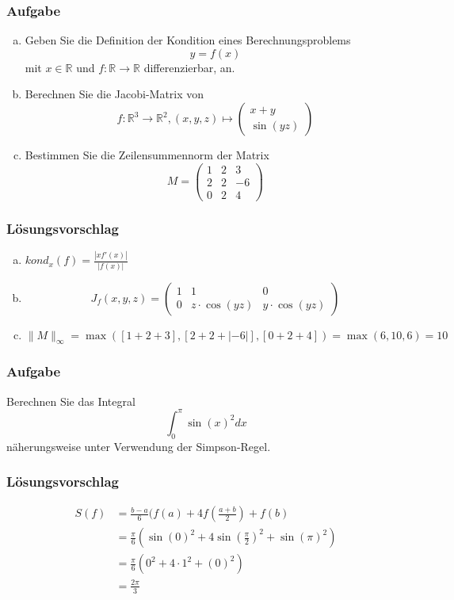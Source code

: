 \documentclass[a4paper,11pt]{scrartcl}
\newcounter{auf}
\newcommand{\Aufgabe}%
        {\addtocounter{auf}{1} \subsubsection*{\rmfamily  Aufgabe \theauf \hspace{1em}} }
\newcommand{\RR}{\mathbb{R}}
\begin{document}
\Aufgabe

\begin{enumerate}[a)]

\item Geben Sie die Definition der Kondition eines Berechnungsproblems 
$$
	y=f(x)
$$
mit $x \in \RR$ und $f:\RR \to \RR$ differenzierbar, an.
\item  Berechnen Sie die Jacobi-Matrix von
$$
f: \RR^3 \to \RR^2, (x,y,z) \mapsto \begin{pmatrix} x+y \\ \sin(yz) \end{pmatrix}
$$
\item Bestimmen Sie die Zeilensummennorm der Matrix
$$
M=\begin{pmatrix} 1&2&3 \\ 2&2&-6\\ 0 & 2&4 \end{pmatrix}
$$
\end{enumerate}
%

\subsubsection*{Lösungsvorschlag}
\begin{enumerate}[a)]
\item $kond_x(f)=\frac{|xf'(x)|}{|f(x)|}$
\item 
$$
J_f(x,y,z)=\begin{pmatrix}1&1&0\\0&z\cdot\cos(yz)&y\cdot\cos(yz) \end{pmatrix}
$$
\item $\|M\|_\infty = \max([1+2+3],[2+2+|-6|],[0+2+4])=\max(6,10,6)=10$
\end{enumerate}
\newpage
\Aufgabe
Berechnen Sie das Integral
$$
\int_0^\pi \sin(x)^2 dx
$$
näherungsweise unter Verwendung
der Simpson-Regel.

%
%
\subsubsection*{Lösungsvorschlag}

\begin{align*}
S(f)&=\frac{b-a}{6}(f(a)+4f(\frac{a+b}{2})+f(b)\\
&=\frac{\pi}{6}(\sin(0)^2+4\sin(\frac{\pi}{2})^2+\sin(\pi)^2)\\
&=\frac{\pi}{6}(0^2+4\cdot 1^2+(0)^2)\\
&=\frac{2\pi}{3}
\end{align*}
\end{document}
